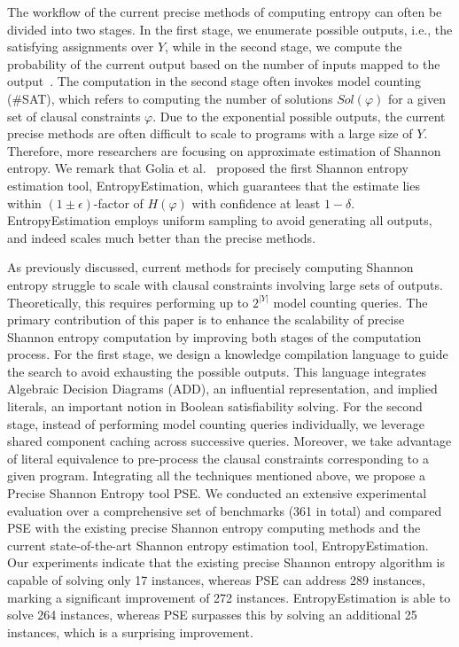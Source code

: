 The workflow of the current precise methods of computing entropy can often be divided into two stages. 
In the first stage, we enumerate possible outputs, i.e., the satisfying assignments over $Y$, while in the second stage, we compute the probability of the current output based on the number of inputs mapped to the output~\cite{golia2022scalable}.
The computation in the second stage often invokes model counting (\#SAT), which refers to computing the number of solutions $\mathit{Sol}(\varphi)$ for a given set of clausal constraints $\varphi$. 
Due to the exponential possible outputs, the current precise methods are often difficult to scale to programs with a large size of $Y$.
Therefore, more researchers are focusing on approximate estimation of Shannon entropy.
We remark that Golia et al.~\cite{golia2022scalable} proposed the first Shannon entropy estimation tool, EntropyEstimation, which guarantees that the estimate lies within $(1 \pm \epsilon)$-factor of $H(\varphi)$ with confidence at least $1-\delta$.
EntropyEstimation employs uniform sampling to avoid generating all outputs, and indeed scales much better than the precise methods. 


As previously discussed, current methods for precisely computing Shannon entropy struggle to scale with clausal constraints involving large sets of outputs.
Theoretically, this requires performing up to $2^{|Y|}$ model counting queries.
The primary contribution of this paper is to enhance the scalability of precise Shannon entropy computation by improving both stages of the computation process.
For the first stage, we design a knowledge compilation language to guide the search to avoid exhausting the possible outputs. 
This language integrates Algebraic Decision Diagrams (ADD), an influential representation, and implied literals, an important notion in Boolean satisfiability solving.
For the second stage, instead of performing model counting queries individually, we leverage shared component caching across successive queries.
Moreover, we take advantage of literal equivalence to pre-process the clausal constraints corresponding to a given program.
Integrating all the techniques mentioned above, we propose a Precise Shannon Entropy tool PSE.
We conducted an extensive experimental evaluation over a comprehensive set of benchmarks (361 in total) and compared PSE with the existing precise Shannon entropy computing methods and the current state-of-the-art Shannon entropy estimation tool, EntropyEstimation. %
Our experiments indicate that the existing precise Shannon entropy algorithm is capable of solving only 17 instances, whereas PSE can address 289 instances, marking a significant improvement of 272 instances.
EntropyEstimation is able to solve 264 instances, whereas PSE surpasses this by solving an additional 25 instances, which is a surprising improvement.

